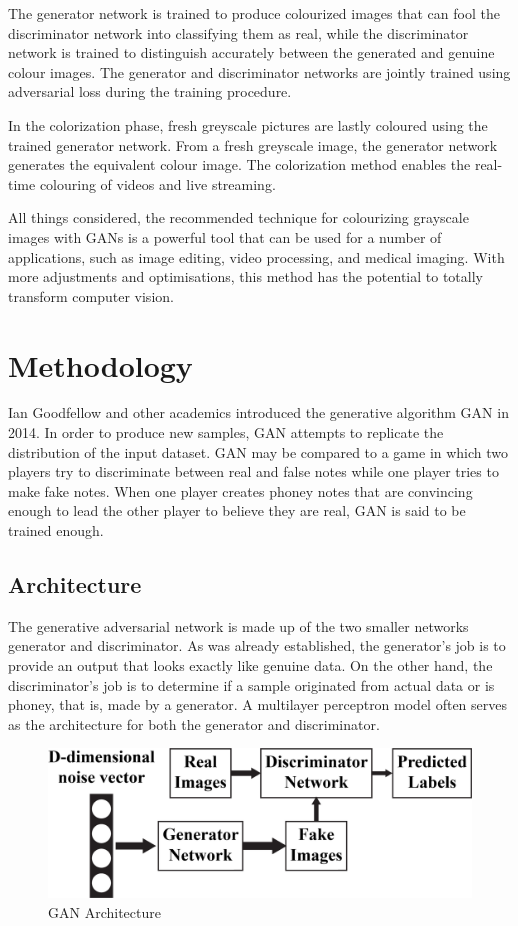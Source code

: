 \documentclass[conference]{IEEEtran}
\begin{document}
The generator network is trained to produce colourized images that can fool the discriminator network into classifying them as real, while the discriminator network is trained to distinguish accurately between the generated and genuine colour images. The generator and discriminator networks are jointly trained using adversarial loss during the training procedure.

In the colorization phase, fresh greyscale pictures are lastly coloured using the trained generator network. From a fresh greyscale image, the generator network generates the equivalent colour image. The colorization method enables the real-time colouring of videos and live streaming.

All things considered, the recommended technique for colourizing grayscale images with GANs is a powerful tool that can be used for a number of applications, such as image editing, video processing, and medical imaging. With more adjustments and optimisations, this method has the potential to totally transform computer vision.

\section{Methodology}\label{Methodology}
Ian Goodfellow and other academics introduced the generative algorithm GAN in 2014. In order to produce new samples, GAN attempts to replicate the distribution of the input dataset. GAN may be compared to a game in which two players try to discriminate between real and false notes while one player tries to make fake notes. When one player creates phoney notes that are convincing enough to lead the other player to believe they are real, GAN is said to be trained enough.

\subsection{Architecture}\label{Architecture}
The generative adversarial network is made up of the two smaller networks generator and discriminator. As was already established, the generator's job is to provide an output that looks exactly like genuine data. On the other hand, the discriminator's job is to determine if a sample originated from actual data or is phoney, that is, made by a generator. A multilayer perceptron model often serves as the architecture for both the generator and discriminator. 

\begin{figure}[h]
\centerline{\includegraphics[width=\linewidth]{GAN-Architecture}}
\caption{GAN Architecture}
\label{fig}
\end{figure}
\end{document}
